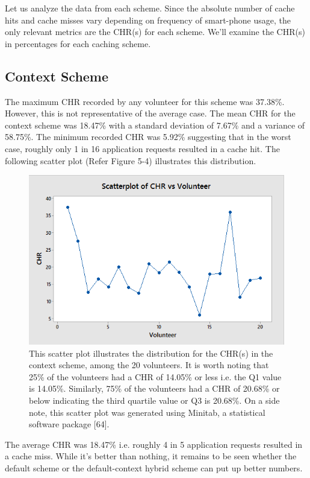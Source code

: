 \documentclass[12pt]{uthesis-v12}  %
\begin{document}
			Let us analyze the data from each scheme. Since the absolute number of cache hits and cache misses vary depending on frequency of smart-phone usage, the only relevant metrics are the CHR(s) for each scheme. We'll examine the CHR(s) in percentages for each caching scheme.
			
			\subsection{Context Scheme}
				The maximum CHR recorded by any volunteer for this scheme was 37.38\%. However, this is not representative of the average case. The mean CHR for the context scheme was 18.47\% with a standard deviation of 7.67\% and a variance of 58.75\%. The minimum recorded CHR was 5.92\% suggesting that in the worst case, roughly only 1 in 16 application requests resulted in a cache hit. The following scatter plot (Refer Figure 5-4) illustrates this distribution.
				
				\begin{figure}[h]
					\centering
					\includegraphics[width = 130mm]{images/contextScheme.png}
					\caption[Distribution of CHR for Context Scheme]{This scatter plot illustrates the distribution for the CHR(s) in the context scheme, among the 20 volunteers. It is worth noting that 25\% of the volunteers had a CHR of 14.05\% or less i.e. the Q1 value is 14.05\%. Similarly, 75\% of the volunteers had a CHR of 20.68\% or below indicating the third quartile value or Q3 is 20.68\%. On a side note, this scatter plot was generated using Minitab, a statistical software package [64].}
				\end{figure}
				
				The average CHR was 18.47\% i.e. roughly 4 in 5 application requests resulted in a cache miss. While it's better than nothing, it remains to be seen whether the default scheme or the default-context hybrid scheme can put up better numbers.	
			
\end{document}
